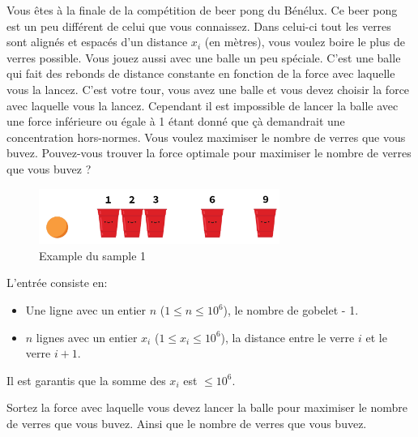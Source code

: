\problemname{\problemyamlname}


\newcommand{\maxn}{10^{6}}

Vous êtes à la finale de la compétition de beer pong du Bénélux. Ce beer pong est un peu différent de celui que vous connaissez. Dans celui-ci tout les verres sont alignés et espacés d'un distance $x_i$ (en mètres), vous voulez boire le plus de verres possible. Vous jouez aussi avec une balle un peu spéciale. C'est une balle qui fait des rebonds de distance constante en fonction de la force avec laquelle vous la lancez.
C'est votre tour, vous avez une balle et vous devez choisir la force avec laquelle vous la lancez. Cependant il est impossible de lancer la balle avec une force inférieure ou égale à 1 étant donné que çà demandrait une concentration hors-normes. Vous voulez maximiser le nombre de verres que vous buvez. Pouvez-vous trouver la force optimale pour maximiser le nombre de verres que vous buvez ?
\smallskip
\begin{figure}[h]
    \centering
    \includegraphics[width=0.7\textwidth]{illustration.png}
    \caption{Example du sample 1}
\end{figure}

\begin{Input}
    L'entrée consiste en:
    \begin{itemize}
        \item Une ligne avec un entier  $n$ ($1\leq n\leq \maxn$), le nombre de gobelet - 1.
        \item $n$ lignes avec un entier $x_i$ ($1\leq x_i\leq \maxn$), la distance entre le verre $i$ et le verre $i+1$.
    \end{itemize}
    Il est garantis que la somme des $x_i$ est $\leq 10^6$.
\end{Input}

\begin{Output}
    Sortez la force avec laquelle vous devez lancer la balle pour maximiser le nombre de verres que vous buvez. Ainsi que le nombre de verres que vous buvez.
\end{Output}
